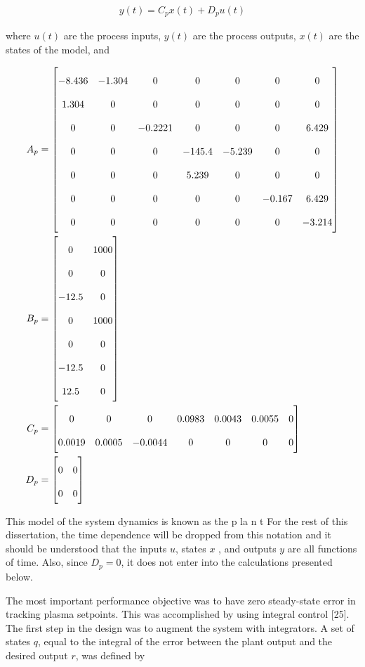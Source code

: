 \begin{align}
	y(t) = C_{p} x(t) + D_{p}u(t)
\end{align}

\noindent where $u(t)$ are the process inputs, $y(t)$ are the process outputs, $x(t)$ are the states of the model, and

\begin{align}
	\renewcommand\arraystretch{2} A_{p} &= \begin{bmatrix}
		-8.436 & -1.304 & 0 & 0 & 0 & 0 & 0 \\ 1.304 & 0 & 0 & 0 & 0 & 0 & 0 \\ 0 & 0 & -0.2221 & 0 & 0 & 0 & 6.429 \\ 0 & 0 & 0 & -145.4 & -5.239 & 0 & 0 \\ 0 & 0 & 0 & 5.239 & 0 & 0 & 0 \\ 0 & 0 & 0 & 0 & 0 & -0.167 & 6.429 \\ 0 & 0 & 0 & 0 & 0 & 0 & -3.214 
	\end{bmatrix} \\
	B_{p} &= \begin{bmatrix}
		0 & 1000 \\ 0 & 0 \\ -12.5 & 0 \\ 0 & 1000 \\ 0 & 0 \\ -12.5 & 0 \\ 12.5 & 0
	\end{bmatrix} \\
	C_{p} &= \begin{bmatrix}
		0 & 0 & 0 & 0.0983 & 0.0043 & 0.0055 & 0 \\ 0.0019 & 0.0005 & -0.0044 & 0 & 0 & 0 & 0
	\end{bmatrix} \\
	D_{p} &= \begin{bmatrix}
		0 & 0 \\ 0 & 0
	\end{bmatrix}
\end{align}

\noindent This model of the system dynamics is known as the p la n t For the rest of this dissertation, the time dependence will be dropped from this notation and it should be understood that the inputs $u$, states $x$ , and outputs $y$ are all functions of time. Also, since $D_{p}=0$, it does not enter into the calculations presented below.


The most important performance objective was to have zero steady-state error in tracking plasma setpoints. This was accomplished by using integral control [25]. The first step in the design was to augment the system with integrators. A set of states $q$, equal to the integral of the error between the plant output and the desired output $r$, was defined by

